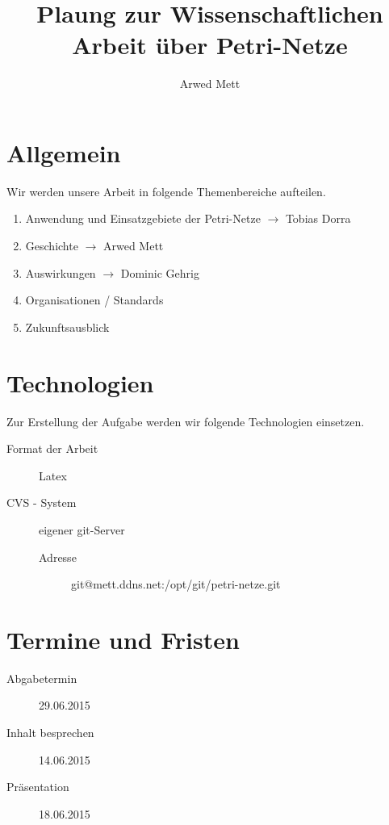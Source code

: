 \documentclass{article}
\title{Plaung zur Wissenschaftlichen Arbeit über Petri-Netze}
\author{Arwed Mett}
\begin{document}
\maketitle

\section{Allgemein}
Wir werden unsere Arbeit in folgende Themenbereiche aufteilen.
\begin{enumerate}
    \item Anwendung und Einsatzgebiete der Petri-Netze $\rightarrow$ Tobias Dorra
    \item Geschichte $\rightarrow$ Arwed Mett
    \item Auswirkungen $\rightarrow$ Dominic Gehrig
    \item Organisationen / Standards
    \item Zukunftsausblick
\end{enumerate}

\section{Technologien}
Zur Erstellung der Aufgabe werden wir folgende Technologien einsetzen.
\begin{description}
    \item[Format der Arbeit] Latex
    \item[CVS - System] eigener git-Server
        \begin{description}
            \item[Adresse] git@mett.ddns.net:/opt/git/petri-netze.git
        \end{description}
\end{description}

\section{Termine und Fristen}
\begin{description}
    \item[Abgabetermin] 29.06.2015
    \item[Inhalt besprechen] 14.06.2015
    \item[Präsentation] 18.06.2015
\end{description}
\end{document}
